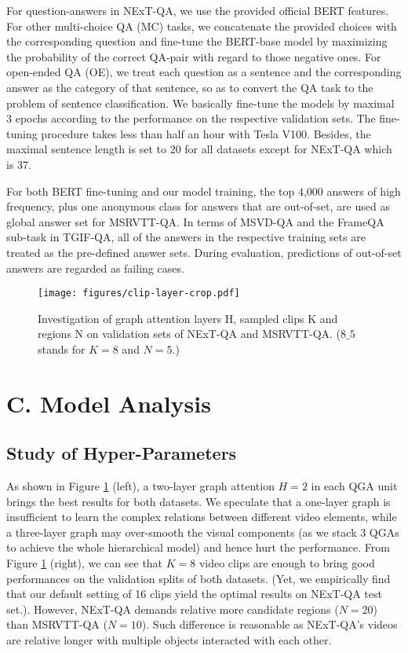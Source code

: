 \documentclass[letterpaper]{article} \usepackage{aaai21}  \usepackage{times}  \usepackage{helvet} \usepackage{courier}  \usepackage[hyphens]{url}  \usepackage{graphicx} \urlstyle{rm} \def\UrlFont{\rm}  \usepackage{natbib}  \usepackage{caption} \usepackage{color, colortbl}
\begin{document}
For question-answers in NExT-QA, we use the provided official BERT \cite{devlin2018bert} features. For other multi-choice QA (MC) tasks, we concatenate the provided choices with the corresponding question and fine-tune the BERT-base model by maximizing the probability of the correct QA-pair with regard to those negative ones. For open-ended QA (OE), we treat each question as a sentence and the corresponding answer as the category of that sentence, so as to convert the QA task to the problem of sentence classification. We basically fine-tune the models by maximal 3 epochs according to the performance on the respective validation sets. The fine-tuning procedure takes less than half an hour with Tesla V100. Besides, the maximal sentence length is set to 20 for all datasets except for NExT-QA which is 37. 

For both BERT fine-tuning and our model training, the top 4,000 answers of high frequency, plus one anonymous class for answers that are out-of-set, are used as global answer set for MSRVTT-QA. In terms of MSVD-QA and the FrameQA sub-task in TGIF-QA, all of the answers in the respective training sets are treated as the pre-defined answer sets. During evaluation, predictions of out-of-set answers are regarded as failing cases.  
\begin{figure}[t!]
 \centering
 \texttt{[image: figures/clip-layer-crop.pdf]}
 \caption{Investigation of graph attention layers H, sampled clips K and regions N on validation sets of NExT-QA and MSRVTT-QA. ($8\_5$ stands for $K=8$ and $N=5$.)}
 \label{fig:layer_cr}
 \vspace{-1.0em}
\end{figure}

\section{C. Model Analysis}

\subsection{Study of Hyper-Parameters}
As shown in Figure \ref{fig:layer_cr} (left), a two-layer graph attention $H=2$ in each QGA unit brings the best results for both datasets. We speculate that a one-layer graph is insufficient to learn the complex relations between different video elements, while a three-layer graph may over-smooth the visual components (as we stack 3 QGAs to achieve the whole hierarchical model) and hence hurt the performance. From Figure \ref{fig:layer_cr} (right), we can see that $K=8$ video clips are enough to bring good performances on the validation splits of both datasets. (Yet, we empirically find that our default setting of 16 clips yield the optimal results on NExT-QA test set.). However, NExT-QA demands relative more candidate regions ($N=20$) than MSRVTT-QA ($N=10$). Such difference is reasonable as NExT-QA's videos are relative longer with multiple objects interacted with each other.
\end{document}
